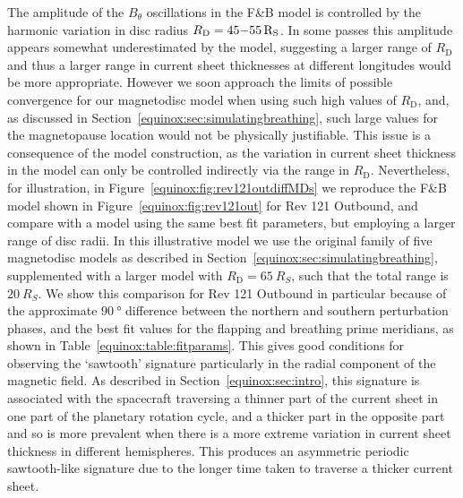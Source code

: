 The amplitude of the $B_{\theta}$ oscillations in the F{\&}B model is controlled by the harmonic variation in disc radius $R_\mathrm{D}=45{\--}\SI{55}{R_S}$. In some passes this amplitude appears somewhat underestimated by the model, suggesting a larger range of $R_\mathrm{D}$ and thus a larger range in current sheet thicknesses at different longitudes would be more appropriate. However we soon approach the limits of possible convergence for our magnetodisc model when using such high values of $R_\mathrm{D}$, and, as discussed in Section~\ref{equinox:sec:simulatingbreathing}, such large values for the magnetopause location would not be physically justifiable. This issue is a consequence of the model construction, as the variation in current sheet thickness in the model can only be controlled indirectly via the range in $R_\mathrm{D}$. Nevertheless, for illustration, in Figure~\ref{equinox:fig:rev121outdiffMDs} we reproduce the F{\&}B model shown in Figure~\ref{equinox:fig:rev121out} for Rev 121 Outbound, and compare with a model using the same best fit parameters, but employing a larger range of disc radii. In this illustrative model we use the original family of five magnetodisc models as described in Section~\ref{equinox:sec:simulatingbreathing}, supplemented with a larger model with $R_\mathrm{D}=\SI{65}{R_S}$, such that the total range is $\SI{20}{R_S}$. We show this comparison for Rev 121 Outbound in particular because of the approximate $\SI{90}{\degree}$ difference between the northern and southern perturbation phases, and the best fit values for the flapping and breathing prime meridians, as shown in Table~\ref{equinox:table:fitparams}. This gives good conditions for observing the `sawtooth' signature particularly in the radial component of the magnetic field. As described in Section~\ref{equinox:sec:intro}, this signature is associated with the spacecraft traversing a thinner part of the current sheet in one part of the planetary rotation cycle, and a thicker part in the opposite part \citep{cowley2017a} and so is more prevalent when there is a more extreme variation in current sheet thickness in different hemispheres. This produces an asymmetric periodic sawtooth-like signature due to the longer time taken to traverse a thicker current sheet. 

